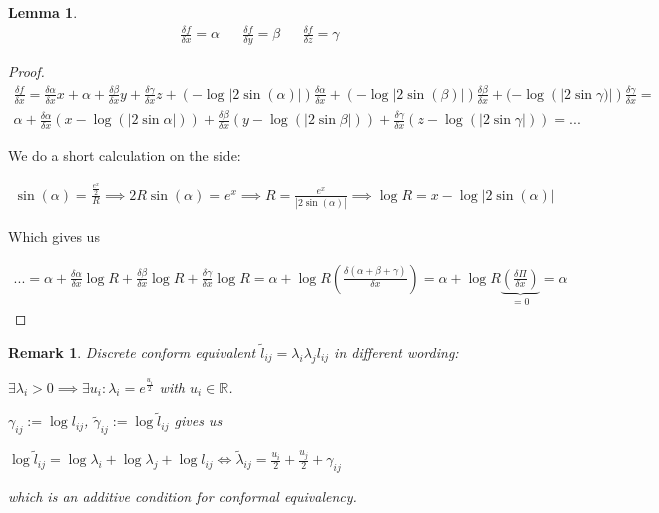 \documentclass[]{article}
\newtheorem{lemma}{Lemma}
\newtheorem{remark}{Remark}
\begin{document}
\begin{lemma}
	\begin{align*}
		\frac{\delta f}{\delta x} = \alpha && \frac{\delta f}{\delta y} = \beta && \frac{\delta f}{\delta z} = \gamma
	\end{align*}
\end{lemma}

\begin{proof}
	\begin{align*}
		\frac{\delta f}{\delta x} = \frac{\delta \alpha}{\delta x} x + \alpha + \frac{\delta \beta}{\delta x} y + \frac{\delta \gamma}{\delta x}z + (- \log |2\sin(\alpha)|) \frac{\delta \alpha}{\delta x} + (-\log |2\sin(\beta)|) \frac{\delta \beta}{\delta x} + (- \log(|2\sin\gamma)|) \frac{\delta \gamma}{\delta x} =\\
		\alpha + \frac{\delta \alpha}{\delta x}(x-\log(|2\sin\alpha|)) + \frac{\delta \beta}{\delta x}(y-\log(|2\sin\beta|)) + \frac{\delta \gamma}{\delta x}(z-\log(|2\sin\gamma|)) = ...
	\end{align*}
	
	We do a short calculation on the side:
	
	\begin{align*}
		\sin(\alpha) = \frac{\frac{e^x}{2}}{R} \implies 2 R \sin(\alpha) = e^x \implies R = \frac{e^x}{|2 \sin(\alpha)|} \implies \log R = x - \log|2\sin(\alpha)|
	\end{align*}
	
	Which gives us
	
	\begin{align*}
		... = \alpha + \frac{\delta \alpha}{\delta x} \log R + \frac{\delta \beta}{\delta x} \log R + \frac{\delta \gamma}{\delta x} \log R = \alpha + \log R (\frac{\delta (\alpha + \beta + \gamma)}{\delta x}) = \alpha + \log R \underbrace{(\frac{\delta \Pi}{\delta x})}_{=0} = \alpha
	\end{align*}
\end{proof}

\begin{remark}
	Discrete conform equivalent $\tilde{l}_{ij} = \lambda_i\lambda_j l_{ij}$ in different wording:
	
	$\exists \lambda_i > 0 \implies \exists u_i : \lambda_i = e^{\frac{u_i}{2}}$ with $u_i \in \mathbb{R}$.
	
	$\gamma_{ij} := \log l_{ij}$, $\tilde{\gamma}_{ij} := \log \tilde{l}_{ij}$ gives us
	
	$\log \tilde{l}_{ij} = \log \lambda_i + \log \lambda_j + \log l_{ij} \iff \tilde{\lambda}_{ij} = \frac{u_i}{2} + \frac{u_j}{2} + \gamma_{ij}$
	
	which is an additive condition for conformal equivalency.
\end{remark}
\end{document}

